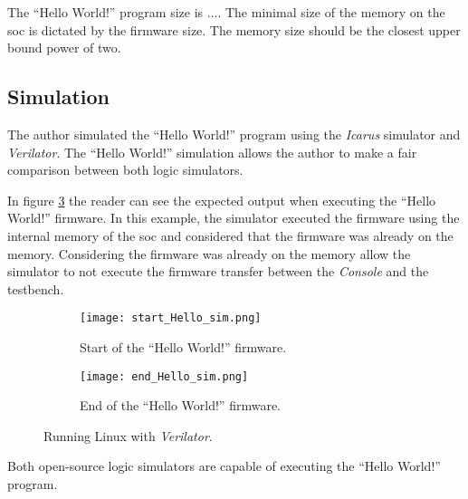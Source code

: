 The \enquote{Hello World!} program size is .... The minimal size of the memory on the \acrlong{soc} is dictated by the firmware size. The memory size should be the closest upper bound power of two.

\subsection{Simulation}
The author simulated the \enquote{Hello World!} program using the \textit{Icarus} simulator and \textit{Verilator}. The \enquote{Hello World!} simulation allows the author to make a fair comparison between both logic simulators. 

In figure \ref{fig:hello_sim} the reader can see the expected output when executing the \enquote{Hello World!} firmware. In this example, the simulator executed the firmware using the internal memory of the \acrlong{soc} and considered that the firmware was already on the memory. Considering the firmware was already on the memory allow the simulator to not execute the firmware transfer between the \textit{Console} and the testbench.

\begin{figure}[!ht]
    \centering
    \begin{subfigure}[b]{0.49\textwidth}
        \centering
        \texttt{[image: start\_Hello\_sim.png]}
        \caption{Start of the \enquote{Hello World!} firmware.}
        \label{fig:start_hello_sim}
    \end{subfigure}
    \hfill
    \begin{subfigure}[b]{0.49\textwidth}
        \centering
        \texttt{[image: end\_Hello\_sim.png]}
        \caption{End of the \enquote{Hello World!} firmware.}
        \label{fig:end_hello_sim}
    \end{subfigure}
    \caption{Running Linux with \textit{Verilator}.}
    \label{fig:hello_sim}
\end{figure}

Both open-source logic simulators are capable of executing the \enquote{Hello World!} program. 

